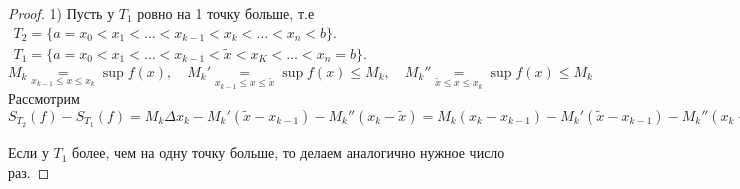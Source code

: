 \documentclass[../main.tex]{subfiles}
\begin{document}
\begin{proof}
    1) Пусть у $T_{1}$ ровно  на 1 точку больше, т.е $\begin{aligned} T_{2}=\{a=x_{0}<x_{1}<\dots<x_{k-1}<x_{k}<\dots<x_{n}<b\}.\\
T_{1}=\{a=x_{0}<x_{1}<\dots<x_{k-1}<\tilde{x}<x_{K}<\dots<x_{n}=b\}.\end{aligned}$\\ 
    $M_{k}\underset{x_{k-1}\leqslant x\leqslant x_{k}}{=}\sup f(x),\quad M_{k}'\underset{x_{k-1}\leqslant x\leqslant \tilde{x}}{=}\sup{f(x)}\leqslant M_{k},\quad M_{k}''\underset{\tilde{x}\leqslant x\leqslant x_{k}}{=}\sup{f(x)}\leqslant M_{k}$\\ 
    Рассмотрим $ S_{T_{2}}(f)-S_{T_{1}}(f)=M_{k}\Delta x_{k}-M_{k}'(\tilde{x}- x_{k-1})-M_{k}''(x_{k}-\tilde{x})=M_{k}(x_{k}-x_{k-1})-M_{k}'(\tilde{x}-x_{k-1})-M_{k}''(x_{k}-\tilde{x})=M_{k}(x_{k}-\tilde{x}+\tilde{x}-x_{k-1})-M_{k}'(\tilde{x}-x_{k-1})=\underbrace{(M_{k}-M_{k}'')}_{\geqslant 0}\underbrace{(x_{k}-\tilde{x})}_{>0}+\underbrace{(M_{k}-M_{k}')}_{\geqslant 0}\underbrace{(\tilde{x}-x_{k-1})}_{>0}\geqslant 0\implies S_{T_{2}}(f)\geqslant S_{T_{1}}(f).$ Если у $T_{1}$ более, чем на одну точку больше, то делаем аналогично нужное число раз.
 \end{proof}
\end{document}
